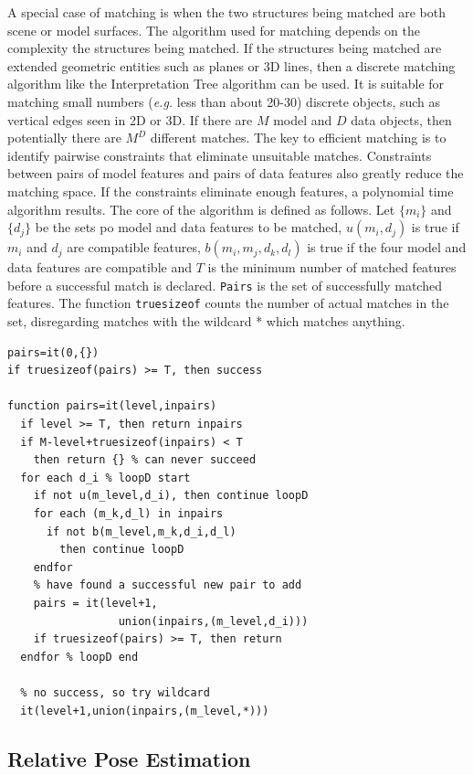 \documentclass[twocolumn,oneside]{book}
\begin{document}
A special case of matching is when the two structures being matched
are both scene or model surfaces. The algorithm used for matching
depends on the complexity the structures being matched.  If the
structures being matched are extended geometric entities such as
planes or 3D lines, then a discrete matching algorithm like the
Interpretation Tree algorithm \cite{grimson} can be used. It is
suitable for matching small numbers ({\it e.g.} less than about 20-30)
discrete objects, such as vertical edges seen in 2D or 3D. If there
are $M$ model and $D$ data objects, then potentially there are $M^D$
different matches. The key to efficient matching is to identify
pairwise constraints that eliminate unsuitable matches. Constraints
between pairs of model features and pairs of data features also
greatly reduce the matching space. If the constraints eliminate enough
features, a polynomial time algorithm results.  The core of the
algorithm is defined as follows.  Let $\{m_i\}$ and $\{d_j\}$ be the
sets po model and data features to be matched, $u(m_i,d_j)$ is true if
$m_i$ and $d_j$ are compatible features, $b(m_i,m_j,d_k,d_l)$ is true
if the four model and data features are compatible and $T$ is the
minimum number of matched features before a successful match is
declared.  \verb+Pairs+ is the set of successfully matched features.
The function \verb+truesizeof+ counts the number of actual matches in
the set, disregarding matches with the wildcard * which matches
anything.
\begin{verbatim}
pairs=it(0,{})
if truesizeof(pairs) >= T, then success

function pairs=it(level,inpairs)
  if level >= T, then return inpairs
  if M-level+truesizeof(inpairs) < T
    then return {} % can never succeed
  for each d_i % loopD start
    if not u(m_level,d_i), then continue loopD
    for each (m_k,d_l) in inpairs
      if not b(m_level,m_k,d_i,d_l)
        then continue loopD
    endfor
    % have found a successful new pair to add
    pairs = it(level+1,
                 union(inpairs,(m_level,d_i)))
    if truesizeof(pairs) >= T, then return
  endfor % loopD end

  % no success, so try wildcard  
  it(level+1,union(inpairs,(m_level,*)))
\end{verbatim}

\subsection{Relative Pose Estimation\label{pose23}} 
\end{document}
